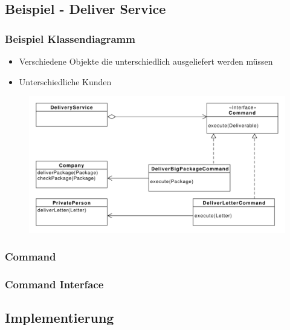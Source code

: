 \subsection{Beispiel - Deliver Service}
\begin{frame}
	\frametitle{Beispiel Klassendiagramm}
	\begin{itemize}
		\item Verschiedene Objekte die unterschiedlich ausgeliefert werden müssen
		\item Unterschiedliche Kunden
	\end{itemize}	
	
  	\begin{figure}
		\includegraphics[scale=.4]{paper/command/DeliverService}
	\end{figure}
\end{frame}


\begin{frame}
	\frametitle{Command}
  	\begin{figure}
	\end{figure}
\end{frame}

\begin{frame}
	\frametitle{Command Interface}
  	\begin{figure}
	\end{figure}
\end{frame}

\subsection{Implementierung}

